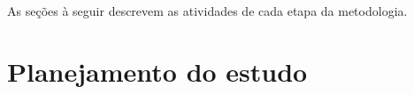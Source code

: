 \documentclass[qual, classic, a4paper]{ufbathesis}
\begin{document}
%  
%  
%  

As seções à seguir descrevem as atividades de cada etapa da metodologia.

\section{Planejamento do estudo}
\end{document}
